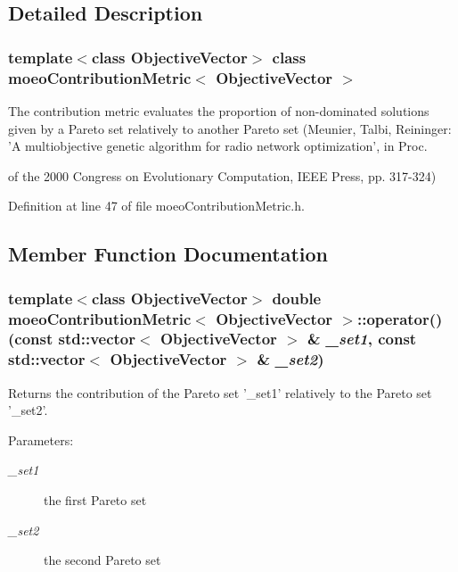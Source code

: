 \subsection{Detailed Description}
\subsubsection*{template$<$class Objective\-Vector$>$ class moeo\-Contribution\-Metric$<$ Objective\-Vector $>$}

The contribution metric evaluates the proportion of non-dominated solutions given by a Pareto set relatively to another Pareto set (Meunier, Talbi, Reininger: 'A multiobjective genetic algorithm for radio network optimization', in Proc. 

of the 2000 Congress on Evolutionary Computation, IEEE Press, pp. 317-324) 



Definition at line 47 of file moeo\-Contribution\-Metric.h.

\subsection{Member Function Documentation}
\subsubsection{\setlength{\rightskip}{0pt plus 5cm}template$<$class Objective\-Vector$>$ double \bf{moeo\-Contribution\-Metric}$<$ Objective\-Vector $>$::operator() (const std::vector$<$ Objective\-Vector $>$ \& {\em \_\-set1}, const std::vector$<$ Objective\-Vector $>$ \& {\em \_\-set2})\hspace{0.3cm}{\tt  [inline]}}\label{classmoeoContributionMetric_491610f6557874c2989eaa7a75117dcb}


Returns the contribution of the Pareto set '\_\-set1' relatively to the Pareto set '\_\-set2'. 

\begin{Desc}
\item[Parameters:]
\begin{description}
\item[{\em \_\-set1}]the first Pareto set \item[{\em \_\-set2}]the second Pareto set \end{description}
\end{Desc}


